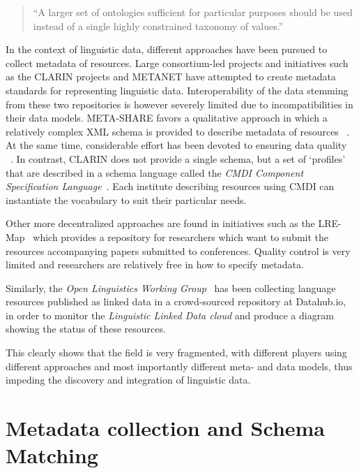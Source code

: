 \documentclass[11pt]{article}
\begin{document}
\begin{quote}
``A larger set of ontologies sufficient for particular purposes should
be used instead of a single highly constrained taxonomy of values.''
\end{quote}



In the context of linguistic data, different approaches have been pursued to collect metadata of resources. 
Large consortium-led projects and initiatives such as the CLARIN projects and
METANET have attempted to create metadata standards for representing linguistic data. 
Interoperability of the data stemming from these two repositories is however
severely limited due to incompatibilities in their data models.
META-SHARE favors a qualitative  approach in which a relatively complex XML schema is provided to describe metadata of resources ~\cite{gavrilidou2012meta}. At the same time, considerable effort has been devoted to ensuring data quality ~\cite{piperidis2012meta}.
In contrast, CLARIN does not provide a single schema, but a set of `profiles'
that are described in a schema language called the \emph{CMDI Component
Specification Language}~\cite{broeder2012cmdi}. Each institute describing resources using CMDI can instantiate the vocabulary to suit their particular needs.

Other more decentralized approaches are found in initiatives such as the
LRE-Map~\cite{calzolari2012lre} which provides a repository for researchers which want to submit the resources accompanying papers submitted to conferences. Quality control is very limited and researchers are relatively free in how to specify metadata. 

Similarly, the \emph{Open Linguistics Working Group}~\cite{chiarcos2012open} has
been collecting language resources published as linked data in a crowd-sourced
repository at Datahub.io, in order to monitor the \emph{Linguistic Linked Data
cloud} and produce a diagram showing the status of these resources.

This clearly shows that the field is very fragmented, with different
players using different approaches and most importantly different meta- and 
data models, thus impeding the discovery and integration of linguistic data. 

\section{Metadata collection and Schema Matching}
\end{document}
